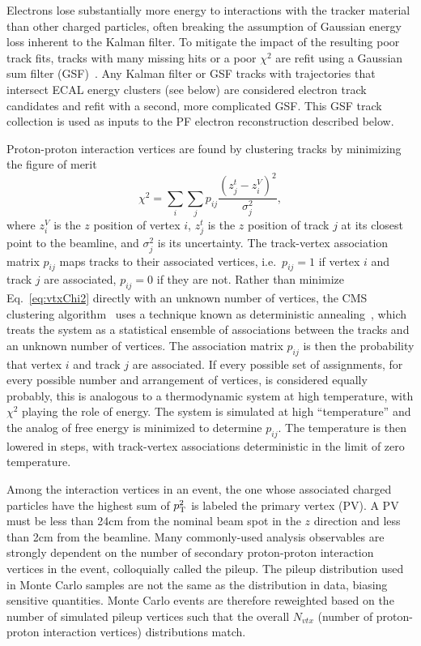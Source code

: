 Electrons lose substantially more energy to interactions with the tracker material than other charged particles, often breaking the assumption of Gaussian energy loss inherent to the Kalman filter.
To mitigate the impact of the resulting poor track fits, tracks with many missing hits or a poor $\chi^2$ are refit using a Gaussian sum filter (GSF)~\cite{Adam:2005bya}.
Any Kalman filter or GSF tracks with trajectories that intersect ECAL energy clusters (see below) are considered electron track candidates and refit with a second, more complicated GSF\@.
This GSF track collection is used as inputs to the PF electron reconstruction described below.

Proton-proton interaction vertices are found by clustering tracks by minimizing the figure of merit
\begin{equation}\label{eq:vtxChi2}
  \chi^2 = \sum_i \sum_j p_{ij} \frac{\left(z^t_j - z^V_i\right)^2}{\sigma_{j}^2},
\end{equation}
where $z^V_i$ is the $z$ position of vertex $i$, $z^t_j$ is the $z$ position of track $j$ at its closest point to the beamline, and $\sigma_j^2$ is its uncertainty.
The track-vertex association matrix $p_{ij}$ maps tracks to their associated vertices, i.e.\ $p_{ij} = 1$ if vertex $i$ and track $j$ are associated, $p_{ij} = 0$ if they are not.
Rather than minimize Eq.~\ref{eq:vtxChi2} directly with an unknown number of vertices, the CMS clustering algorithm~\cite{Speer:2006mh,Chatrchyan:2014fea} uses a technique known as deterministic annealing~\cite{Rose:726788}, which treats the system as a statistical ensemble of associations between the tracks and an unknown number of vertices.
The association matrix $p_{ij}$ is then the probability that vertex $i$ and track $j$ are associated.
If every possible set of assignments, for every possible number and arrangement of vertices, is considered equally probably, this is analogous to a thermodynamic system at high temperature, with $\chi^2$ playing the role of energy.
The system is simulated at high ``temperature'' and the analog of free energy is minimized to determine $p_{ij}$.
The temperature is then lowered in steps, with track-vertex associations deterministic in the limit of zero temperature.

Among the interaction vertices in an event, the one whose associated charged particles have the highest sum of $p_\mathrm{T}^2$ is labeled the primary vertex (PV).
A PV must be less than 24\unit{cm} from the nominal beam spot in the $z$ direction and less than 2\unit{cm} from the beamline.
Many commonly-used analysis observables are strongly dependent on the number of secondary proton-proton interaction vertices in the event, colloquially called the pileup.
The pileup distribution used in Monte Carlo samples are not the same as the distribution in data, biasing sensitive quantities.
Monte Carlo events are therefore reweighted based on the number of simulated pileup vertices such that the overall $N_\textit{vtx}$ (number of proton-proton interaction vertices) distributions match.




